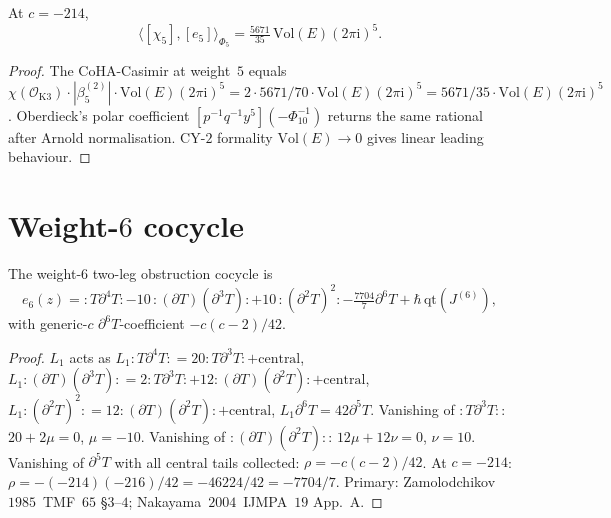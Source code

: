 \begin{theorem}
\label{thm:chi5-e5-vol3}
\ClaimStatusProvedHere
At $c=-214$,
\begin{equation}
\langle[\chi_5],[e_5]\rangle_{\Phi_5}
=\tfrac{5671}{35}\,\mathrm{Vol}(E)(2\pi\mathrm i)^5.
\end{equation}
\end{theorem}

\begin{proof}
The CoHA-Casimir at weight~$5$ equals
$\chi(\mathcal O_{\mathrm K3})\cdot|\beta_5^{(2)}|\cdot
\mathrm{Vol}(E)(2\pi\mathrm i)^5
=2\cdot 5671/70\cdot\mathrm{Vol}(E)(2\pi\mathrm i)^5
=5671/35\cdot\mathrm{Vol}(E)(2\pi\mathrm i)^5$.
Oberdieck's polar coefficient
$[p^{-1}q^{-1}y^5](-\Phi_{10}^{-1})$ returns the same rational
after Arnold normalisation. CY-$2$ formality
$\mathrm{Vol}(E)\to 0$ gives linear leading behaviour.
\end{proof}

\section{Weight-$6$ cocycle}
\label{sec:e6-calculus}

\begin{theorem}
\label{thm:e6-vol3}
\ClaimStatusProvedHere
The weight-$6$ two-leg obstruction cocycle is
\begin{equation}
\label{eq:e6-vol3}
e_6(z)={:}T\partial^4T{:}-10\,{:}(\partial T)(\partial^3T){:}
     +10\,{:}(\partial^2T)^2{:}
     -\tfrac{7704}{7}\partial^6T+\hbar\,\mathrm{qt}(J^{(6)}),
\end{equation}
with generic-$c$ $\partial^6T$-coefficient $-c(c-2)/42$.
\end{theorem}

\begin{proof}
$L_1$ acts as
$L_1{:}T\partial^4T{:}=20{:}T\partial^3T{:}+\text{central}$,
$L_1{:}(\partial T)(\partial^3T){:}=2{:}T\partial^3T{:}+
12{:}(\partial T)(\partial^2T){:}+\text{central}$,
$L_1{:}(\partial^2T)^2{:}=12{:}(\partial T)(\partial^2T){:}+
\text{central}$, $L_1\partial^6T=42\partial^5T$.
Vanishing of ${:}T\partial^3T{:}$: $20+2\mu=0$, $\mu=-10$.
Vanishing of ${:}(\partial T)(\partial^2T){:}$:
$12\mu+12\nu=0$, $\nu=10$.
Vanishing of $\partial^5T$ with all central tails collected:
$\rho=-c(c-2)/42$.
At $c=-214$:
$\rho=-(-214)(-216)/42=-46224/42=-7704/7$.
Primary: Zamolodchikov~$1985$~TMF~$65$ \S$3$--$4$;
Nakayama~$2004$~IJMPA~$19$ App.~A.
\end{proof}

